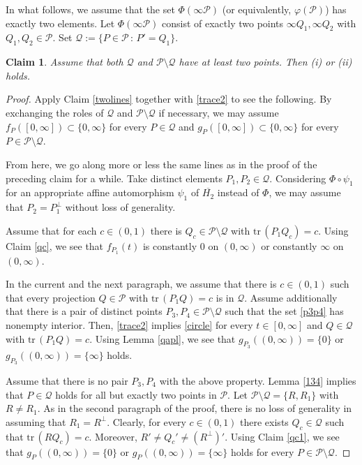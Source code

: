\documentclass[10pt]{amsart}
\newtheorem{claim}[theorem]{Claim}
\theoremstyle{definition}
\theoremstyle{remark}
\numberwithin{subsection}{section}
\numberwithin{equation}{section}
\newcommand\cP{{\mathcal{P}}}
\newcommand\oH{{\overline{H_2}}}
\begin{document}
In what follows, we assume that the set $\Phi(\infty \cP)$ (or equivalently,  $\varphi(\cP)$) has exactly two elements. 
Let $\Phi(\infty \cP)$ consist of exactly two points $\infty Q_1, \infty Q_2$ with $Q_1, Q_2\in \cP$. 
Set $\mathcal{Q}:=\{P\in \cP\,:\, P'=Q_1\}$.

\begin{claim}
Assume that both $\mathcal{Q}$ and $\cP\setminus \mathcal{Q}$ have at least two points.
Then (i) or (ii) holds. 
\end{claim} 
\begin{proof}
Apply Claim \ref{twolines} together with \eqref{trace2} to see the following.
By exchanging the roles of $\mathcal{Q}$ and $\cP\setminus \mathcal{Q}$ if necessary, we may assume $f_P([0, \infty])\subset \{0,\infty\}$ for every $P\in \mathcal{Q}$
and $g_P([0, \infty])\subset \{0,\infty\}$ for every $P\in \cP\setminus \mathcal{Q}$.

From here, we go along more or less the same lines as in the proof of the preceding claim for a while.
Take distinct elements $P_1, P_2\in \mathcal{Q}$.  
Considering $\Phi\circ \psi_1$ for an appropriate affine automorphism $\psi_1$ of $\oH$ instead of $\Phi$, we may assume that $P_2=P_1^\perp$ without loss of generality.

Assume that for each $c\in (0, 1)$ there is $Q_c\in \cP\setminus \mathcal{Q}$ with $\mathrm{tr}\,(P_1Q_c)=c$. 
Using Claim \ref{qc}, we see that $f_{P_1}(t)$ is constantly $0$ on $(0, \infty)$ or constantly $\infty$ on $(0,\infty)$.

In the current and the next paragraph, we assume that there is $c\in (0, 1)$ such that every projection $Q\in \cP$ with $\mathrm{tr}\,(P_1Q)=c$ is in $\mathcal{Q}$. 
Assume additionally that there is a pair of distinct points $P_3, P_4\in \cP\setminus \mathcal{Q}$ such that the set \eqref{p3p4} has nonempty interior.  
Then, \eqref{trace2} implies \eqref{circle}
for every $t\in [0, \infty]$ and $Q\in \mathcal{Q}$ with $\mathrm{tr}\,(P_1Q)=c$. 
Using Lemma \ref{qapl}, we see that $g_{P_3}((0, \infty))=\{0\}$ or $g_{P_3}((0, \infty))=\{\infty\}$ holds.

Assume that there is no pair $P_3, P_4$ with the above property.
Lemma \ref{134} implies that $P\in \mathcal{Q}$ holds for all but exactly two points in $\cP$. 
Let $\mathcal{P} \setminus \mathcal{Q} = \{ R , R_1 \}$ with $R \not= R_1$. 
As in the second paragraph of the proof, there is no loss of generality in assuming that $R_1 = R^\perp$. Clearly, for every $c \in (0,1)$ there exists $Q_c \in \mathcal{Q}$ such that $\mathrm{tr}\, (RQ_c) = c$. Moreover, $R' \not= Q_{c}' \not= (R^\perp)'$.  
Using Claim \ref{qc1}, we see that $g_{P}((0, \infty))=\{0\}$ or $g_{P}((0, \infty))=\{\infty\}$ holds for every $P\in \cP\setminus\mathcal{Q}$.


\end{proof}
\end{document}
